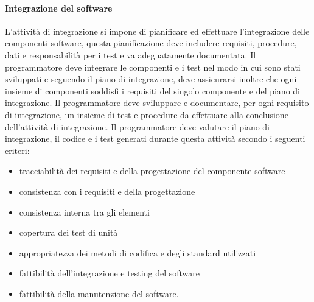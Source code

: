 \documentclass[../../norme-di-progetto.tex]{subfiles}
\begin{document}
\paragraph{Integrazione del software}%
\label{par:integrazione_software}
L'attività di integrazione si impone di pianificare ed effettuare l'integrazione delle componenti software, questa pianificazione deve includere requisiti, procedure, dati e responsabilità per i test e va adeguatamente documentata.
Il programmatore deve integrare le componenti e i test nel modo in cui sono stati sviluppati e seguendo il piano di integrazione, deve assicurarsi inoltre che ogni insieme di componenti soddisfi i requisiti del singolo componente e del piano di integrazione.
Il programmatore deve sviluppare e documentare, per ogni requisito di integrazione, un insieme di test e procedure da effettuare alla conclusione dell'attività di integrazione.
Il programmatore deve valutare il piano di integrazione, il codice e i test generati durante questa attività secondo i seguenti criteri:
\begin{itemize}
  \item tracciabilità dei requisiti e della progettazione del componente software
  \item consistenza con i requisiti e della progettazione
  \item consistenza interna tra gli elementi
  \item copertura dei test di unità
  \item appropriatezza dei metodi di codifica e degli standard utilizzati
  \item fattibilità dell'integrazione e testing del software
  \item fattibilità della manutenzione del software.
\end{itemize}
\end{document}
